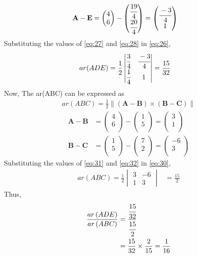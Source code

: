 \documentclass[12pt]{article}
\newcommand{\mydet}[1]{\ensuremath{\begin{vmatrix}#1\end{vmatrix}}}
\providecommand{\brak}[1]{\ensuremath{\left(#1\right)}}
\providecommand{\norm}[1]{\left\lVert#1\right\rVert}
\newcommand{\myvec}[1]{\ensuremath{\begin{pmatrix}#1\end{pmatrix}}}
\let\vec\mathbf
\begin{document}
\begin{enumerate}
\begin{align}
	  \vec{A}- \vec{E} &= \myvec{4\\6\\}-\myvec{\cfrac{19}{4}\\ \cfrac{20}{4}\\}=\myvec{\cfrac{-3}{4}\\1\\}\label{eq:28}
  \end{align}
Substituting the values of \eqref{eq:27} and \eqref{eq:28} in \eqref{eq:26},
\begin{align}
	ar(ADE)=\frac{1}{2}\mydet{\cfrac{3}{4} & \cfrac{-3}{4}\\ \cfrac{1}{4} & 1}  
	&=	\frac{15}{32}
\end{align}
Now,		
		The ar(ABC) can be expressed as
  \begin{align}
	  ar(ABC)=\frac{1}{2} \norm{\brak{\vec{A}-\vec{B}}  \times 
   \brak{\vec{B}- \vec{C}}} \label{eq:30} 
\end{align}
\begin{align}
	\vec{A}- \vec{B} &= \myvec{4\\6\\}-\myvec{1\\5\\}=\myvec{3\\1\\}\label{eq:31}\\
	  \vec{B}-\vec{C} &= \myvec{1\\5\\}-\myvec{7\\2\\}=\myvec{-6\\3\\}\label{eq:32}
  \end{align}
Substituting the values of \eqref{eq:31} and \eqref{eq:32} in \eqref{eq:30},
\begin{align}
	ar(ABC)=\frac{1}{2}\mydet{3 & -6\\1 & 3}  
	&=	\frac{15}{2}
\end{align}
		Thus,
\begin{align}
	\frac{ar\brak{ADE}}{ar\brak{ABC}}&=\frac{\cfrac{15}{32}}{\cfrac{15}{2}}\\
	&=\frac{15}{32}\times \frac{2}{15}=\frac{1}{16}
\end{align}


\end{enumerate}
\end{document}
